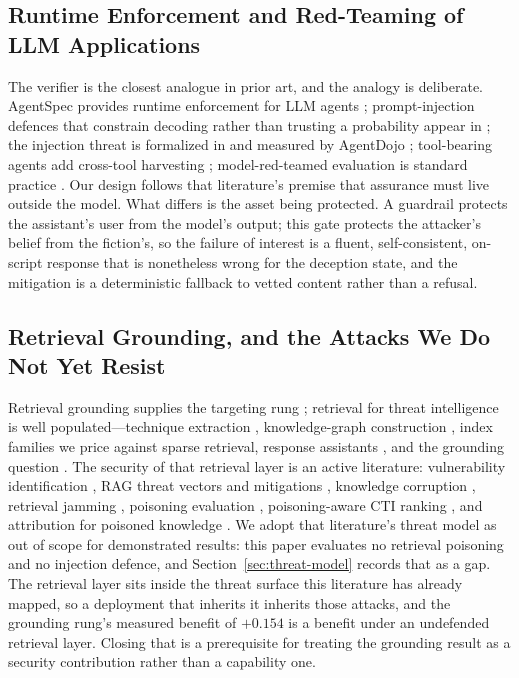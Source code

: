 \subsection{Runtime Enforcement and Red-Teaming of LLM Applications}

The verifier is the closest analogue in prior art, and the analogy is
deliberate. AgentSpec provides runtime enforcement for LLM agents
\cite{wang2026agentspec}; prompt-injection defences that constrain
decoding rather than trusting a probability appear in
\cite{chen2025struq,chen2025secalign}; the injection threat is
formalized in \cite{greshake2023} and measured by AgentDojo
\cite{debenedetti2024agentdojo}; tool-bearing agents add cross-tool
harvesting \cite{li2026dissonances}; model-red-teamed evaluation is
standard practice \cite{ganguli2022,perez2022,bai2022,christiano2017}. Our design follows
that literature's premise that assurance must live outside the model. What
differs is the asset being protected. A guardrail protects the assistant's
user from the model's output; this gate protects the attacker's belief from
the fiction's, so the failure of interest is a fluent, self-consistent,
on-script response that is nonetheless wrong for the deception state, and
the mitigation is a deterministic fallback to vetted content rather than a
refusal.

\subsection{Retrieval Grounding, and the Attacks We Do Not Yet Resist}

Retrieval grounding supplies the targeting rung \cite{lewis2020};
retrieval for threat intelligence is well populated---technique
extraction \cite{fayyazi2023,lekssays2025}, knowledge-graph construction
\cite{gao2025,jeon2024,belmahjoub2025}, index families \cite{malkov2018}
we price against sparse retrieval, response assistants
\cite{rajapaksha2024,paul2025,qiao2025,liu2025}, and the \attck{}
grounding question \cite{roy2023,alsada2024,noureddine2020}. The
security of that retrieval layer is an active literature: vulnerability
identification \cite{xue2024,liang2025}, RAG threat vectors and
mitigations \cite{ward2025}, knowledge corruption
\cite{zou2025poisonedrag,chaudhari2024}, retrieval jamming
\cite{shafran2024}, poisoning evaluation \cite{malladi2026ripeii},
poisoning-aware CTI ranking \cite{jia2025}, and attribution for poisoned
knowledge \cite{zhang2026ragorigin}. We adopt that literature's threat
model as out of scope for demonstrated results: this paper evaluates no
retrieval poisoning and no injection defence, and
Section~\ref{sec:threat-model} records that as a gap. The retrieval layer
sits inside the threat surface this literature has already mapped, so a
deployment that inherits it inherits those attacks, and the grounding
rung's measured benefit of $+0.154$ is a benefit under an undefended
retrieval layer. Closing
that is a prerequisite for treating the grounding result as a security
contribution rather than a capability one.


